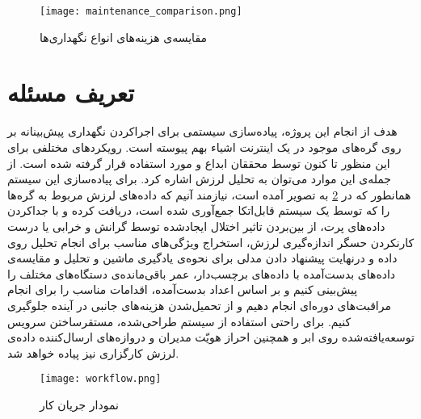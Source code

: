\begin{figure}[!h]
\centerline{\texttt{[image: maintenance\_comparison.png]}}
\caption{مقایسه‌ی هزینه‌های انواع نگهد‌اری‌ها}
\label{fig:maintenance_comparison}
\end{figure}


\section{تعریف مسئله}
هدف از انجام این پروژه، پیاده‌سازی سیستمی برای اجراکردن نگهداری پیش‌بینانه بر روی گره‌های موجود در یک اینترنت اشیاء بهم پیوسته است. رویکردهای مختلفی برای این منظور تا کنون توسط محققان ابداع و مورد استفاده قرار گرفته شده است. از جمله‌ی این موارد می‌توان به تحلیل لرزش اشاره کرد. برای پیاده‌سازی این سیستم همانطور که در \cref{fig:workflow} به تصویر آمده ‌است، نیازمند آنیم که داده‌های لرزش مربوط به گره‌ها را که توسط یک سیستم قابل‌اتکا جمع‌آوری شده است، دریافت کرده و با جداکردن داده‌های پرت، از بین‌بردن تاثیر اختلال ایجادشده توسط گرانش و خرابی یا درست‌ کارنکردن حسگر اندازه‌گیری لرزش، استخراج ویژگی‌های مناسب برای انجام تحلیل روی داده و درنهایت پیشنهاد دادن مدلی برای نحوه‌ی یادگیری ماشین و تحلیل و مقایسه‌ی داده‌های بدست‌آمده با داده‌های برچسب‌دار، عمر باقی‌مانده‌ی دستگاه‌های مختلف را پیش‌بینی کنیم و بر اساس اعداد بدست‌آمده، اقدامات مناسب را برای انجام مراقبت‌های دوره‌ای انجام دهیم و از تحمیل‌شدن هزینه‌های جانبی در آینده جلوگیری کنیم\cite{jung2017vibration}. برای راحتی استفاده از سیستم طراحی‌شده، مستقرساختن سرویس توسعه‌یافته‌شده روی ابر و همچنین احراز هویّت مدیران و دروازه‌های ارسال‌کننده داده‌ی لرزش کارگزاری نیز پیاده خواهد شد.

\begin{figure}[!h]
\centerline{\texttt{[image: workflow.png]}}
\caption{نمودار جریان کار}
\label{fig:workflow}
\end{figure}


